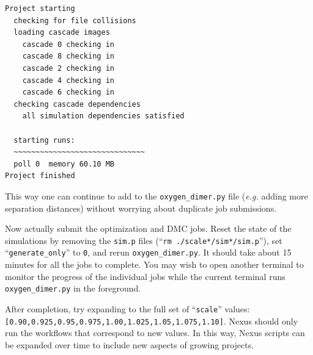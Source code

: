 \documentclass[oneside,11pt]{memoir}
\numberwithin{equation}{section}
\begin{document}
\begin{shaded}
\begin{verbatim}
Project starting 
  checking for file collisions 
  loading cascade images 
    cascade 0 checking in 
    cascade 8 checking in 
    cascade 2 checking in 
    cascade 4 checking in 
    cascade 6 checking in 
  checking cascade dependencies 
    all simulation dependencies satisfied 
  
  starting runs:
  ~~~~~~~~~~~~~~~~~~~~~~~~~~~~~~ 
  poll 0  memory 60.10 MB 
Project finished
\end{verbatim}
\end{shaded}
\noindent
This way one can continue to add to the \texttt{oxygen\_dimer.py} file (\emph{e.g.} adding more separation distances) without worrying about duplicate job submissions.

Now actually submit the optimization and DMC jobs.  Reset the state of the simulations by removing the \texttt{sim.p} files (``\texttt{rm ./scale*/sim*/sim.p}''), set ``\texttt{generate\_only}'' to \texttt{0}, and rerun \texttt{oxygen\_dimer.py}.  It should take about 15 minutes for all the jobs to complete.  You may wish to open another terminal to monitor the progress of the individual jobs while the current terminal runs \texttt{oxygen\_dimer.py} in the foreground.  

After completion, try expanding to the full set of ``\texttt{scale}'' values:\newline \texttt{[0.90,0.925,0.95,0.975,1.00,1.025,1.05,1.075,1.10]}.  Nexus should only run the workflows that correspond to new values.  In this way, Nexus scripts can be expanded over time to include new aspects of growing projects. 
\end{document}

